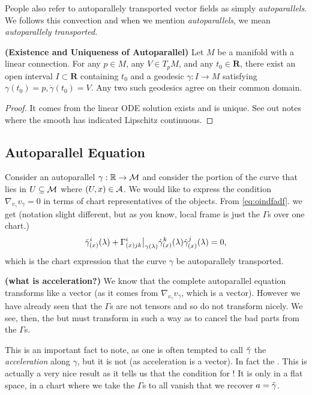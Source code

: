 \documentclass[12pt]{article} %
\newcommand{\bfs}[1]{\textbf{({#1}) }}
\begin{document}
\bter 
    People also refer to autoparallely transported vector fields as simply \textit{autoparallels}. We follows this convection and when we mention \textit{autoparallels}, we mean \textit{autoparallely transported.}
\eter 
\begin{thma}\bfs{Existence and Uniqueness of Autoparallel}\label{lem:dfafdaf}
Let $M$ be a manifold with a linear connection. For any $p \in M$, any $V \in T_{p} M$, and any $t_{0} \in \mathbf{R}$, there exist an open interval $I \subset \mathbf{R}$ containing $t_{0}$ and a geodesic $\gamma: I \rightarrow M$ satisfying $\gamma\left(t_{0}\right)=p, \dot{\gamma}\left(t_{0}\right)=V$. Any two such geodesics agree on their common domain.
\end{thma}
\begin{proof}
    It comes from the linear ODE solution exists and is unique. See out notes where the smooth has indicated Lipschitz continuous. 
\end{proof}
\subsection{Autoparallel Equation}

Consider an autoparallel $\gamma:\mathbb{R}\to\mathcal{M}$ and consider the portion of the curve that lies in $U\subseteq \mathcal{M}$ where $(U,x)\in\mathcal{A}$. We would like to express the condition $\nabla_{v_{\gamma}}v_{\gamma}=0$ in terms of chart representatives of the objects. From  \cref{eq:oindfadf}. we get  (notation slight different, but as you know, local frame is just the $\Gamma$s over one chart.)
\begin{align*}
    \Ddot{\gamma}^i_{(x)}(\lambda) + \Gamma^i_{(x)jk}\big|_{\gamma(\lambda)}\Dot{\gamma}^k_{(x)}(\lambda)\Dot{\gamma}^j_{(x)}(\lambda) = 0,
\end{align*}
which is the chart expression that the curve $\gamma$ be autoparallely transported.

\br
\label{rem:Acc}\bfs{what is acceleration?}
    We know that the complete autoparallel equation transforms like a vector (as it comes from $\nabla_{v_{\gamma}}v_{\gamma}$, which is a vector). However we have already seen that the $\Gamma$s are not tensors and so do not transform nicely. We see, then, the  but must transform in such a way as to cancel the bad parts from the $\Gamma$s. 
    
    This is an important fact to note, as one is often tempted to call $\Ddot{\gamma}$ the \textit{acceleration} along $\gamma$, but it is not (as acceleration is a vector). In fact the . This is actually a very nice result as it tells us that the condition for ! It is only in a flat space, in a chart where we take the $\Gamma$s to all vanish that we recover $a=\Ddot{\gamma}$.
\er 
\end{document}

